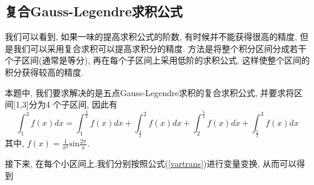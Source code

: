 \documentclass[a4paper]{article}
\begin{document}
\begin{spacing}{1.5}
\begin{CJK*}{GBK}{song}
\subsection{复合Gauss-Legendre求积公式}
我们可以看到, 如果一味的提高求积公式的阶数, 有时候并不能获得很高的精度, 但是我们可以采用复合求积可以提高求积分的精度. 方法是将整个积分区间分成若干个子区间(通常是等分), 再在每个子区间上采用低阶的求积公式, 这样使整个区间的积分获得较高的精度.\par
本题中, 我们要求解决的是五点Gauss-Legendre求积的复合求积公式, 并要求将区间[1,3]分为4 个子区间, 因此有
\begin{equation}\label{gl_spec}
  \int_{1}^3 f(x)dx = \int_{1}^{\frac{3}{2}} f(x)dx + \int_{\frac{3}{2}}^{2}f(x)dx + \int_{2}^{\frac{5}{2}}f(x)dx +\int_{\frac{5}{2}}^{3}f(x)dx
\end{equation}
其中, $f(x) = \frac{1}{x^2}\text{sin}\frac{2\pi}{x}$.\par
接下来, 在每个小区间上,我们分别按照公式(\ref{vartrans})进行变量变换, 从而可以得到


\end{CJK*}
\end{spacing}
\end{document}
